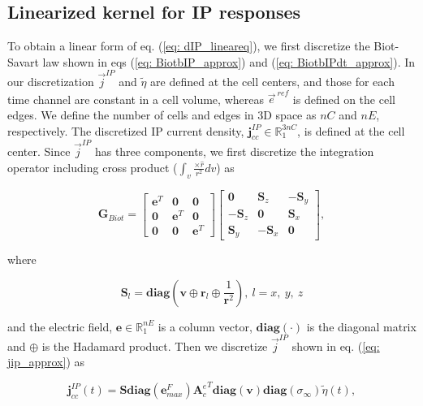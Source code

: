 \documentclass[extra,mreferee]{gji}
\newcommand{\siginf}{\sigma_\infty}
\newcommand{\Ace}{{\mathbf A_c^e}}
\newcommand{\diag}{\mathbf{diag}}
\renewcommand {\j}  { {\vec j} }
\newcommand {\e}  { {\vec e} }
\renewcommand {\dj}  { {\mathbf{j} } }
\newcommand {\de}  { {\mathbf{e} } }
\newcommand{\vol}{\mathbf{v}}
\newcommand{\peta}{\tilde{\eta}}
\newcommand{\eref}{\e^{\ ref}}
\begin{document}
\subsection{Linearized kernel for IP responses}
\label{section:linearkernel_discrete}
To obtain a linear form of  eq. (\ref{eq: dIP_lineareq}),
we first discretize  the Biot-Savart law shown in eqs (\ref{eq: BiotbIP_approx}) and (\ref{eq: BiotbIPdt_approx}). In our discretization $\j^{IP}$ and  $\peta$ are defined at the cell centers, and those for each time channel are constant in a cell volume, whereas $\eref$ is defined on the cell edges.
We define the number of cells and edges in 3D space as $nC$ and $nE$, respectively. The discretized IP current density, $\dj^{IP}_{cc} \in \mathbb{R}^{3nC}_{1}$, is defined at the cell center. Since $\j^{IP}$ has three components, we first discretize the integration operator including cross product ($\int_{v}\frac{ \times \hat{r}}{r^2}dv$) as
\begin{linenomath*}
\begin{equation}
  \mathbf{G}_{Biot} =
  \begin{bmatrix}
       \mathbf{e}^T &  \mathbf{0}   & \mathbf{0}  \\
       \mathbf{0}   &  \mathbf{e}^T & \mathbf{0}  \\
       \mathbf{0}   &  \mathbf{0}   & \mathbf{e}^T
    \end{bmatrix}
  \begin{bmatrix}
       \mathbf{0}     &   \mathbf{S}_z   & -\mathbf{S}_y  \\
      -\mathbf{S}_z   &   \mathbf{0}     &  \mathbf{S}_x  \\
       \mathbf{S}_y   &  -\mathbf{S}_x   &  \mathbf{0}
    \end{bmatrix},
\end{equation}
\end{linenomath*}
where
\begin{linenomath*}
\begin{equation*}
  \mathbf{S}_l =\diag(\mathbf{v}\oplus \mathbf{r}_l \oplus \frac{1}{\mathbf{r}^2}), \ l = x, \ y, \ z
\end{equation*}
\end{linenomath*}
and the electric field, $\mathbf{e} \in \mathbb{R}^{nE}_1$ is a column vector, $\diag(\cdot)$ is the diagonal matrix and $\oplus$ is the Hadamard product.
Then we discretize $\j^{IP}$ shown in eq. (\ref{eq: jip_approx}) as
\begin{linenomath*}
\begin{equation}
  \dj^{IP}_{cc}(t) = \mathbf{S}\diag(\de^{F}_{max})\Ace^T\diag(\vol)\diag(\siginf)\peta(t),
\end{equation}
\end{linenomath*}
\end{document}
